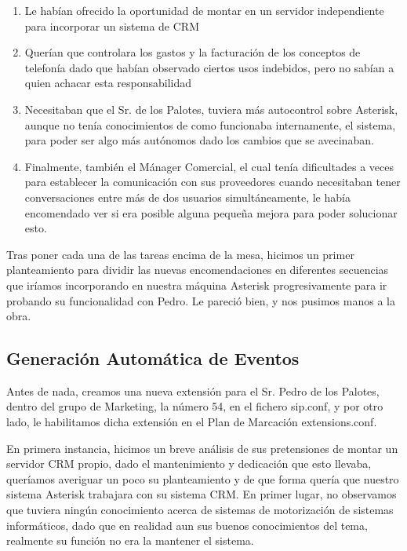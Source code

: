 \begin{enumerate}

\item Le habían ofrecido la oportunidad de montar en un servidor independiente para incorporar un sistema de CRM
\item Querían que controlara los gastos y la facturación de los conceptos de telefonía dado que habían observado ciertos usos indebidos, pero no sabían a quien achacar esta responsabilidad
\item Necesitaban que el Sr. de los Palotes, tuviera más autocontrol sobre Asterisk, aunque no tenía conocimientos de como funcionaba internamente, el sistema, para poder ser algo más autónomos dado los cambios que se avecinaban.
\item Finalmente, también el Mánager Comercial, el cual tenía dificultades a veces para establecer la comunicación con sus proveedores cuando necesitaban tener conversaciones entre más de dos usuarios simultáneamente, le había encomendado ver si era posible alguna pequeña mejora para poder solucionar esto.

\end{enumerate}

Tras poner cada una de las tareas encima de la mesa, hicimos un primer planteamiento para dividir las nuevas encomendaciones en diferentes secuencias que iríamos incorporando en nuestra máquina Asterisk progresivamente para ir probando su funcionalidad con Pedro. Le pareció bien, y nos pusimos manos a la obra.

\newpage

\color[rgb]{0,0,0}


\subsection{Generación Automática de Eventos}
Antes de nada, creamos una nueva extensión para el Sr. Pedro de los Palotes, dentro del grupo de Marketing, la número 54, en el fichero sip.conf, y por otro lado, le habilitamos dicha extensión en el Plan de Marcación extensions.conf.

En primera instancia, hicimos un breve análisis de sus pretensiones de montar un servidor CRM propio, dado el mantenimiento y dedicación que esto llevaba, queríamos averiguar un poco su planteamiento y de que forma quería que nuestro sistema Asterisk trabajara con su sistema CRM. En primer lugar, no observamos que tuviera ningún conocimiento acerca de sistemas de motorización de sistemas informáticos, dado que en realidad aun sus buenos conocimientos del tema, realmente su función no era la mantener el sistema. 

